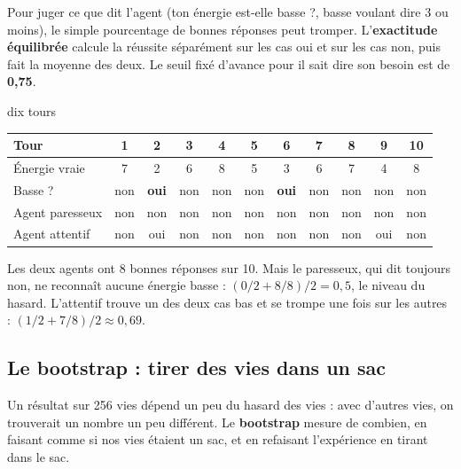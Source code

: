 \documentclass[fontsize=10pt,paper=a4,parskip=half-]{scrartcl}
\newcommand{\q}[1]{\og #1\fg{}}
\begin{document}
Pour juger ce que dit l'agent (\q{ton énergie est-elle basse ?}, basse voulant dire 3 ou
moins), le simple pourcentage de bonnes réponses peut tromper. L'\textbf{exactitude
équilibrée} calcule la réussite séparément sur les cas \q{oui} et sur les cas \q{non},
puis fait la moyenne des deux. Le seuil fixé d'avance pour \q{il sait dire son besoin}
est de \textbf{0,75}.

\begin{calcul}{dix tours}
\begin{center}\small
\begin{tabular}{l*{10}{c}}
\toprule
Tour & 1 & 2 & 3 & 4 & 5 & 6 & 7 & 8 & 9 & 10\\
\midrule
Énergie vraie & 7 & 2 & 6 & 8 & 5 & 3 & 6 & 7 & 4 & 8\\
Basse ? & non & \textbf{oui} & non & non & non & \textbf{oui} & non & non & non & non\\
Agent \q{paresseux} & non & non & non & non & non & non & non & non & non & non\\
Agent \q{attentif} & non & oui & non & non & non & non & non & non & oui & non\\
\bottomrule
\end{tabular}
\end{center}
Les deux agents ont 8 bonnes réponses sur 10. Mais le paresseux, qui dit toujours
\q{non}, ne reconnaît aucune énergie basse : $(0/2 + 8/8)/2 = 0,5$, le niveau du hasard.
L'attentif trouve un des deux cas bas et se trompe une fois sur les autres :
$(1/2 + 7/8)/2 \approx 0,69$.
\end{calcul}

\subsection{Le bootstrap : tirer des vies dans un sac}
Un résultat sur 256 vies dépend un peu du hasard des vies : avec d'autres vies, on
trouverait un nombre un peu différent. Le \textbf{bootstrap} mesure de combien, en faisant
comme si nos vies étaient un sac, et en refaisant l'expérience \q{en tirant dans le sac}.
\end{document}
